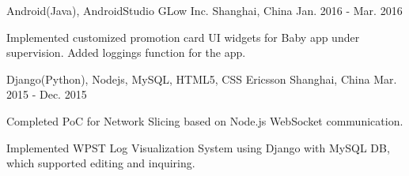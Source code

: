 \begin{cventries}

\cventry
{Android(Java), AndroidStudio} %
{GLow Inc.} %
{Shanghai, China} %
{Jan. 2016 - Mar. 2016} %
{ %
\begin{cvitems}
\item {Implemented customized promotion card UI widgets for Baby app under supervision. Added loggings function for the app.}
\end{cvitems}
}


\cventry
{Django(Python), Nodejs, MySQL, HTML5, CSS} %
{Ericsson} %
{Shanghai, China} %
{Mar. 2015 - Dec. 2015} %
{ %
\begin{cvitems}
\item {Completed PoC for Network Slicing based on Node.js WebSocket communication.}
\item {Implemented WPST Log Visualization System using Django with MySQL DB, which supported editing and inquiring.}
\end{cvitems}
}


\end{cventries}
